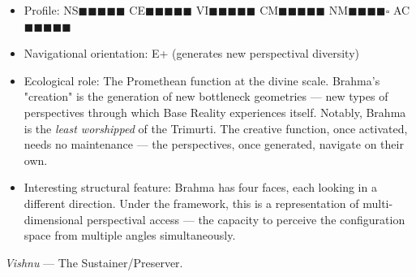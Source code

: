 \begin{itemize}[nosep,leftmargin=*]
  \item Profile: NS$\blacksquare$$\blacksquare$$\blacksquare$$\blacksquare$$\blacksquare$ CE$\blacksquare$$\blacksquare$$\blacksquare$$\blacksquare$$\blacksquare$ VI$\blacksquare$$\blacksquare$$\blacksquare$$\blacksquare$$\blacksquare$ CM$\blacksquare$$\blacksquare$$\blacksquare$$\blacksquare$$\blacksquare$ NM$\blacksquare$$\blacksquare$$\blacksquare$$\blacksquare$$\square$ AC$\blacksquare$$\blacksquare$$\blacksquare$$\blacksquare$$\blacksquare$
  \item Navigational orientation: E+ (generates new perspectival diversity)
  \item Ecological role: The Promethean function at the divine scale. Brahma's "creation" is the generation of new bottleneck geometries — new types of perspectives through which Base Reality experiences itself. Notably, Brahma is the \textit{least worshipped} of the Trimurti. The creative function, once activated, needs no maintenance — the perspectives, once generated, navigate on their own.
  \item Interesting structural feature: Brahma has four faces, each looking in a different direction. Under the framework, this is a representation of multi-dimensional perspectival access — the capacity to perceive the configuration space from multiple angles simultaneously.
\end{itemize}


\textit{Vishnu} — The Sustainer/Preserver.

